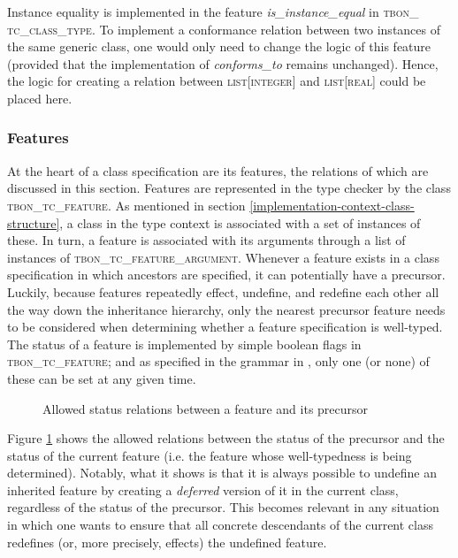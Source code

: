 Instance equality is implemented in the feature \textit{is\_instance\_equal} in \textsc{tbon\_ tc\_class\_type}. To implement a conformance relation between two instances of the same generic class, one would only need to change the logic of this feature (provided that the implementation of \textit{conforms\_to} remains unchanged). Hence, the logic  for creating a relation between \textsc{list}[\textsc{integer}] and \textsc{list}[\textsc{real}] could be placed here.

\subsubsection{Features}
At the heart of a class specification are its features, the relations of which are discussed in this section. Features are represented in the type checker by the class \textsc{tbon\_tc\_feature}. As mentioned in section \ref{implementation-context-class-structure}, a class in the type context is associated with a set of instances of these. In turn, a feature is associated with its arguments through a list of instances of \textsc{tbon\_tc\_feature\_argument}. 
Whenever a feature exists in a class specification in which ancestors are specified, it can potentially have a precursor. Luckily, because features repeatedly effect, undefine, and redefine each other all the way down the inheritance hierarchy, only the nearest precursor feature needs to be considered when determining whether a feature specification is well-typed. The status of a feature is implemented by simple boolean flags in \textsc{tbon\_tc\_feature}; and as specified in the grammar in \cite{walden1995}, only one (or none) of these can be set at any given time.
\begin{figure}[H]
    \centerline{}
    \caption[Feature status matrix]{Allowed status relations between a feature and its precursor}
    \label{fig:feature_status}
\end{figure}
Figure \ref{fig:feature_status} shows the allowed relations between the status of the precursor and the status of the current feature (i.e. the feature whose well-typedness is being determined). Notably, what it shows is that it is always possible to undefine an inherited feature by creating a \textit{deferred} version of it in the current class, regardless of the status of the precursor. This becomes relevant in any situation in which one wants to ensure that all concrete descendants of the current class redefines (or, more precisely, effects) the undefined feature.

